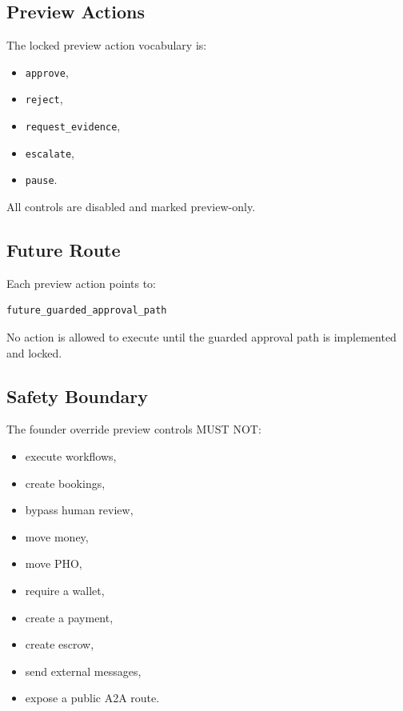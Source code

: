 \subsection{Preview Actions}

The locked preview action vocabulary is:

\begin{itemize}
  \item \texttt{approve},
  \item \texttt{reject},
  \item \texttt{request\_evidence},
  \item \texttt{escalate},
  \item \texttt{pause}.
\end{itemize}

All controls are disabled and marked preview-only.

\subsection{Future Route}

Each preview action points to:

\begin{verbatim}
future_guarded_approval_path
\end{verbatim}

No action is allowed to execute until the guarded approval path is implemented and locked.

\subsection{Safety Boundary}

The founder override preview controls MUST NOT:

\begin{itemize}
  \item execute workflows,
  \item create bookings,
  \item bypass human review,
  \item move money,
  \item move PHO,
  \item require a wallet,
  \item create a payment,
  \item create escrow,
  \item send external messages,
  \item expose a public A2A route.
\end{itemize}

